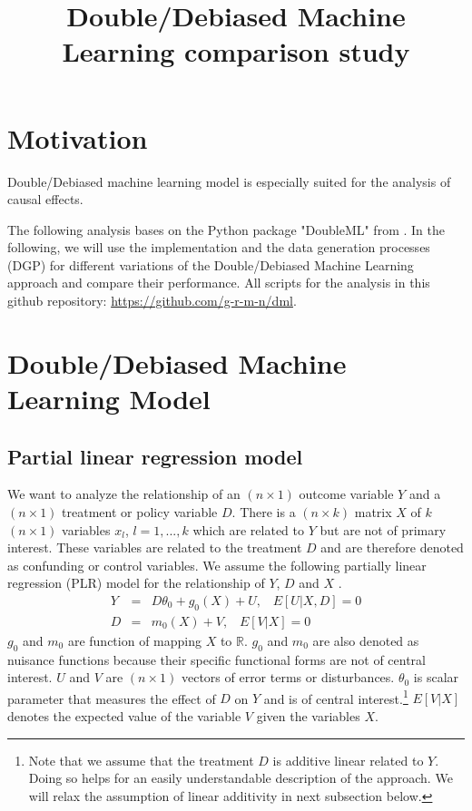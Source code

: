 \documentclass[10pt]{article}
\title{Double/Debiased Machine Learning comparison study}
\begin{document}
\maketitle
{}
\section{Motivation}
Double/Debiased machine learning model is especially suited for the analysis of causal effects.

The following analysis bases on the Python package "DoubleML" from \cite{Bach2022}. 
In the following, we will use the implementation and the data generation processes (DGP) for different variations of the Double/Debiased Machine Learning approach and compare their performance.
All scripts for the analysis in this github repository: \url{https://github.com/g-r-m-n/dml}.

\section{Double/Debiased Machine Learning Model}
\subsection{Partial linear regression model}
We want to analyze the relationship of an $(n \times 1 )$ outcome variable $Y$ and a $(n \times 1 )$ treatment or policy variable $D$. 
There is a $(n \times k )$ matrix $X$ of $k$ $(n \times 1 )$ variables $x_l$, $l=1,...,k$ which are related to $Y$ but are not of primary interest.
These variables are related to the treatment $D$ and are therefore denoted as confunding or control variables.
We assume the following partially linear regression (PLR) model for the relationship of $Y$, $D$ and $X$ \cite{Cher2018}.
\begin{eqnarray}\label{dml_plr_1}
Y &=& D \theta_0 + g_0(X) + U, \;\;\; E[U|X,D] =0  	\\ \label{dml_plr_2}
D &=&  m_0(X) + V, \;\;\; E[V|X] =0  	
\end{eqnarray}
$g_0$ and $m_0$ are function of mapping $X$ to $\mathbb{R}$. 
$g_0$ and $m_0$ are also denoted as nuisance functions because their specific functional forms are not of central interest.
$U$ and $V$ are $(n \times 1 )$ vectors of error terms or disturbances. 
$\theta_0$ is scalar parameter that measures the effect of $D$ on $Y$ and is of central interest.\footnote{
Note that we assume that the treatment $D$ is additive linear related to $Y$. 
Doing so helps for an easily understandable description of the approach.
We will relax the assumption of linear additivity in next subsection below.}
$ E[V|X]$ denotes the expected value of the variable $V$ given the variables $X$.
	
\end{document}
